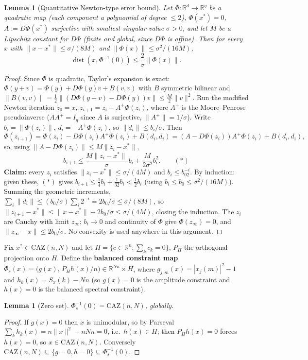\documentclass[11pt]{article}
\theoremstyle{plain}
\newtheorem{lemma}[theorem]{Lemma}
\theoremstyle{definition}
\theoremstyle{remark}
\newcommand{\R}{\mathbb R}
\newcommand{\CAZ}{\mathrm{CAZ}}
\newcommand{\dist}{\operatorname{dist}}
\begin{document}
\begin{lemma}[Quantitative Newton-type error bound]\label{lem:newton}
Let $\Phi:\R^d\to\R^q$ be a quadratic map (each component a polynomial of
degree $\le2$), $\Phi(x^*)=0$, $A:=D\Phi(x^*)$ surjective with smallest
singular value $\sigma>0$, and let $M$ be a Lipschitz constant for $D\Phi$
(finite and global, since $D\Phi$ is affine). Then for every $x$ with
$\|x-x^*\|\le\sigma/(8M)$ and $\|\Phi(x)\|\le\sigma^2/(16M)$,
$$\dist(x,\Phi^{-1}(0))\le\frac2\sigma\|\Phi(x)\|.$$
\end{lemma}
\begin{proof}
Since $\Phi$ is quadratic, Taylor's expansion is exact:
$\Phi(y+v)=\Phi(y)+D\Phi(y)v+B(v,v)$ with $B$ symmetric bilinear and
$\|B(v,v)\|=\tfrac12\|(D\Phi(y+v)-D\Phi(y))v\|\le\tfrac M2\|v\|^2$. Run the
modified Newton iteration $z_0=x$, $z_{i+1}=z_i-A^+\Phi(z_i)$, where $A^+$
is the Moore--Penrose pseudoinverse ($AA^+=I_q$ since $A$ is surjective,
$\|A^+\|=1/\sigma$). Write $b_i=\|\Phi(z_i)\|$, $d_i=-A^+\Phi(z_i)$, so
$\|d_i\|\le b_i/\sigma$. Then
$$\Phi(z_{i+1})=\Phi(z_i)-D\Phi(z_i)A^+\Phi(z_i)+B(d_i,d_i)=(A-D\Phi(z_i))A^+\Phi(z_i)+B(d_i,d_i),$$
so, using $\|A-D\Phi(z_i)\|\le M\|z_i-x^*\|$,
$$b_{i+1}\le\frac{M\|z_i-x^*\|}\sigma\,b_i+\frac M{2\sigma^2}b_i^2.\qquad(*)$$
\textbf{Claim:} every $z_i$ satisfies $\|z_i-x^*\|\le\sigma/(4M)$ and
$b_i\le b_02^{-i}$. By induction: given these, $(*)$ gives
$b_{i+1}\le\tfrac14b_i+\tfrac1{32}b_i<\tfrac12b_i$ (using
$b_i\le b_0\le\sigma^2/(16M)$). Summing the geometric increments,
$\sum_i\|d_i\|\le(b_0/\sigma)\sum_i2^{-i}=2b_0/\sigma\le\sigma/(8M)$, so
$\|z_{i+1}-x^*\|\le\|x-x^*\|+2b_0/\sigma\le\sigma/(4M)$, closing the
induction. The $z_i$ are Cauchy with limit $z_\infty$; $b_i\to0$ and
continuity of $\Phi$ give $\Phi(z_\infty)=0$, and $\|z_\infty-x\|\le2b_0/\sigma$.
No convexity is used anywhere in this argument.
\end{proof}

Fix $x^*\in\CAZ(n,N)$ and let $H=\{c\in\R^n:\sum_kc_k=0\}$, $P_H$ the
orthogonal projection onto $H$. Define the \textbf{balanced constraint map}
$\Phi_s(x)=\bigl(g(x),\,P_Hh(x)/n\bigr)\in\R^{Nn}\times H$, where
$g_{j,m}(x)=|x_j(m)|^2-1$ and $h_k(x)=S_x(k)-Nn$ (so $g(x)=0$ is the
amplitude constraint and $h(x)=0$ is the balanced spectral constraint).

\begin{lemma}[Zero set]\label{lem:phis-zero}
$\Phi_s^{-1}(0)=\CAZ(n,N)$, globally.
\end{lemma}
\begin{proof}
If $g(x)=0$ then $x$ is unimodular, so by Parseval
$\sum_kh_k(x)=n\|x\|^2-nNn=0$, i.e.\ $h(x)\in H$; then $P_Hh(x)=0$ forces
$h(x)=0$, so $x\in\CAZ(n,N)$. Conversely $\CAZ(n,N)\subseteq\{g=0,h=0\}\subseteq\Phi_s^{-1}(0)$.
\end{proof}
\end{document}
